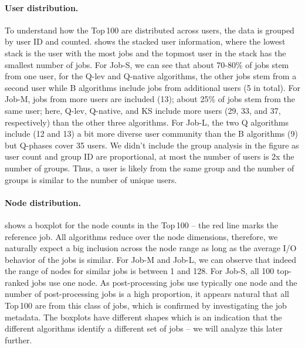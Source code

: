 \documentclass{jhps}
\begin{document}
\paragraph{User distribution.}
To understand how the Top\,100 are distributed across users, the data is grouped by user ID and counted.
 shows the stacked user information, where the lowest stack is the user with the most jobs and the topmost user in the stack has the smallest number of jobs.
For Job-S, we can see that about 70-80\% of jobs stem from one user, for the Q-lev and Q-native algorithms, the other jobs stem from a second user while B algorithms include jobs from additional users (5 in total).
For Job-M, jobs from more users are included (13); about 25\% of jobs stem from the same user; here, Q-lev, Q-native, and KS include more users (29, 33, and 37, respectively) than the other three algorithms.
For Job-L, the two Q algorithms include (12 and 13) a bit more diverse user community than the B algorithms (9) but Q-phases cover 35 users.
We didn't include the group analysis in the figure as user count and group ID are proportional, at most the number of users is 2x the number of groups.
Thus, a user is likely from the same group and the number of groups is similar to the number of unique users.

\paragraph{Node distribution.}
 shows a boxplot for the node counts in the Top\,100 -- the red line marks the reference job.
All algorithms reduce over the node dimensions, therefore, we naturally expect a big inclusion across the node range as long as the average I/O behavior of the jobs is similar.
For Job-M and Job-L, we can observe that indeed the range of nodes for similar jobs is between 1 and 128.
For Job-S, all 100 top-ranked jobs use one node.
As post-processing jobs use typically one node and the number of post-processing jobs is a high proportion, it appears natural that all Top\,100 are from this class of jobs, which is confirmed by investigating the job metadata.
The boxplots have different shapes which is an indication that the different algorithms identify a different set of jobs -- we will analyze this later further.
\end{document}
